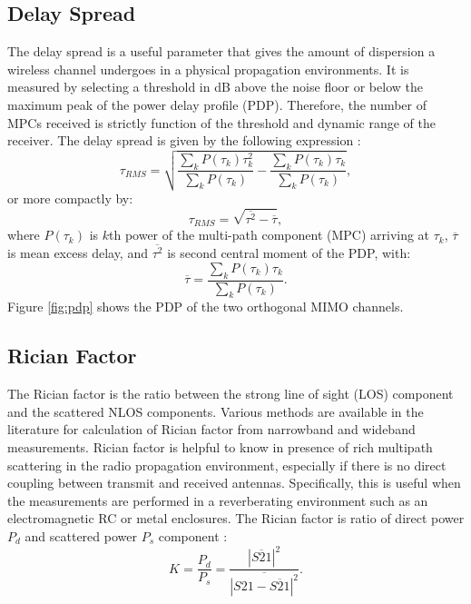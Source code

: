\documentclass[10pt, final, journal, letterpaper, oneside, twocolumn]{IEEEtran}
\begin{document}
\subsection{Delay Spread}
The delay spread is a useful parameter that gives the amount of dispersion a wireless channel undergoes in a physical propagation environments. It is measured by selecting a threshold in dB above the noise floor or below the maximum peak of the power delay profile (PDP).  Therefore, the number of MPCs received is strictly function of the threshold and dynamic range of the receiver. The delay spread is given by the following expression \cite{rappaport1996wireless}:
\begin{equation}
    \tau_{RMS}=\sqrt{\frac{\sum_k P(\tau_k)\tau_k^2}{\sum_k P(\tau_k)}-\frac{\sum_k P(\tau_k)\tau_k}{\sum_k P(\tau_k)}}, 
\end{equation}
or more compactly by:
\begin{equation}
    \tau_{RMS}=\sqrt{\overline{\tau^2}-\overline{\tau}},
\end{equation}
where $P(\tau_{k})$ is $k$th power of the multi-path component (MPC) arriving at $\tau_k$, $\overline{\tau}$ is mean excess delay, and $\overline{\tau^2}$ is second central moment of the PDP, with:
\begin{equation}
    \overline{\tau}=\frac{\sum_k P(\tau_k)\tau_k}{\sum_k P(\tau_k)}.
\end{equation}
Figure \ref{fig:pdp} shows the PDP of the two orthogonal MIMO channels.

\subsection{Rician Factor}
The Rician factor is the ratio between the strong line of sight (LOS) component and the scattered NLOS components. Various methods are available in the literature for calculation of Rician factor from narrowband and wideband measurements. Rician factor is helpful to know in presence of rich multipath scattering in the radio propagation environment, especially if there is no direct coupling between transmit and received antennas. Specifically, this is useful when the measurements are performed in a reverberating environment such as an electromagnetic RC or metal enclosures. The Rician factor is ratio of direct power $P_d$ and scattered power $P_s$ component \cite{holloway2006use}\cite{sanchez2010emulation}\cite{lemoine2009advanced,Mariani2020}:
\begin{equation}
    K=\frac{P_d}{P_s}=\frac{|\overline{S21}|^2}{\overline{|S21-\overline{S21}|^2}}.
\end{equation}
   
\end{document}

